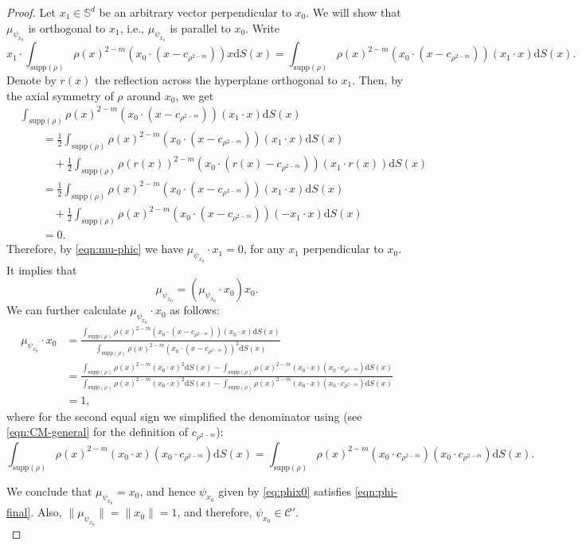 \documentclass[11pt]{amsart}
\newcommand{\bbs}{\mathbb S}
\newcommand{\dx}{\mathrm{d}S (x)}
\newcommand{\supp}{\mathrm{supp}(\rho)}
\newcommand{\dm}{d} %
\begin{document}
\begin{proof}
Let $x_1 \in \bbs^\dm$ be an arbitrary vector perpendicular to $x_0$. We will show that $\mu_{\psi_{x_0}}$ is orthogonal to $x_1$, i.e., $\mu_{\psi_{x_0}}$ is parallel to $x_0$.  Write
\[
x_1 \cdot \int_{\supp}\rho(x)^{2-m}\left(x_0\cdot(x-c_{\rho^{2-m}})\right)x\dx =\int_{\supp}\rho(x)^{2-m}\left(
x_0\cdot(x-c_{\rho^{2-m}})\right)(x_1\cdot x)\dx.
\]
Denote by $r(x)$ the reflection across the hyperplane orthogonal to $x_1$. Then, by the axial symmetry of $\rho$ around $x_0$, we get
\begin{align*}
&\int_{\supp}\rho(x)^{2-m}\left(
x_0\cdot(x-c_{\rho^{2-m}})\right)(x_1\cdot x)\dx\\
&\qquad = \frac{1}{2} \int_{\supp}\rho(x)^{2-m}\left(
x_0\cdot(x-c_{\rho^{2-m}})\right)(x_1\cdot x)\dx \\
& \qquad \quad + \frac{1}{2} \int_{\supp}\rho(r(x))^{2-m}\left(
x_0\cdot(r(x)-c_{\rho^{2-m}})\right)(x_1\cdot r(x))\dx\\
& \qquad = \frac{1}{2} \int_{\supp}\rho(x)^{2-m}\left(
x_0\cdot(x-c_{\rho^{2-m}})\right)(x_1\cdot x)\dx \\
&\qquad \quad + \frac{1}{2} \int_{\supp}\rho(x)^{2-m}\left(
x_0\cdot(x-c_{\rho^{2-m}})\right)(-x_1\cdot x)\dx\\
&\qquad =0.
\end{align*}
Therefore, by \eqref{eqn:mu-phic} we have $\mu_{\psi_{x_0}}\cdot x_1=0$, for any $x_1$ perpendicular to $x_0$. It implies that
\[
\mu_{\psi_{x_0}}=(\mu_{\psi_{x_0}}\cdot x_0)x_0.
\]
We can further calculate $\mu_{\psi_{x_0}}\cdot x_0$ as follows:
\begin{align*}
\mu_{\psi_{x_0}}\cdot x_0&=\frac{\int_{\supp}\rho(x)^{2-m}\left(x_0\cdot(x-c_{\rho^{2-m}})\right)(x_0\cdot x)\dx}{\int_{\supp}\rho(x)^{2-m}\left(x_0\cdot (x-c_{\rho^{2-m}})\right)^2\dx}\\[2pt]
&=\frac{\int_{\supp}\rho(x)^{2-m}(x_0\cdot x)^2\dx-\int_{\supp}\rho(x)^{2-m}(x_0\cdot x)(x_0\cdot c_{\rho^{2-m}})\dx}{\int_{\supp}\rho(x)^{2-m}(x_0\cdot x)^2\dx-\int_{\supp}\rho(x)^{2-m}(x_0\cdot x)(x_0\cdot c_{\rho^{2-m}})\dx}\\[2pt]
&=1,
\end{align*}
where for the second equal sign we simplified the denominator using (see \eqref{eqn:CM-general} for the definition of $c_{\rho^{2-m}}$):
\[
\int_{\supp}\rho(x)^{2-m}(x_0\cdot x)(x_0\cdot c_{\rho^{2-m}})\dx = \int_{\supp}\rho(x)^{2-m}(x_0\cdot c_{\rho^{2-m}})(x_0\cdot c_{\rho^{2-m}})\dx.
\]

We conclude that $\mu_{\psi_{x_0}}=x_0$, and hence $\psi_{x_0}$ given by \eqref{eq:phix0} satisfies \eqref{eqn:phi-final}. Also, $\|\mu_{\psi_{x_0}}\|=\|x_0\|=1$, and therefore,  $\psi_{x_0}\in\mathcal{C}'$.\\


\end{proof}
\end{document}
